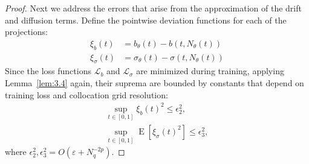 \documentclass[11pt, a4paper]{article}
\theoremstyle{theoremstyle}
\theoremstyle{definitionstyle}
\DeclareMathOperator{\EE}{\mathrm E}
\begin{document}
\begin{proof}
    Next we address the errors that arise from the approximation of the drift and diffusion terms. Define the pointwise deviation functions for each of the projections:
    \begin{subequations}
    \begin{align}
        \xi_b(t) &= b_\theta(t) - b(t, N_\theta(t)) \label{eq:52a} \\
        \xi_\sigma(t) &= \sigma_\theta(t) - \sigma(t, N_\theta(t)) \label{eq:52b}
    \end{align}
    \end{subequations}
    Since the loss functions \(\mathcal L_b\) and \(\mathcal L_\sigma\) are minimized during training, applying Lemma~\ref{lem:3.4} again, their suprema are bounded by constants that depend on training loss and collocation grid resolution:
    \begin{subequations}
    \begin{gather}
        \sup_{t \in [0, 1]} \xi_b(t)^2 \leq \epsilon_2^2, \\
        \sup_{t \in [0, 1]} \EE [\xi_\sigma(t)^2] \leq \epsilon_3^2,
    \end{gather}
    \end{subequations}
    where \(\epsilon_2^2, \epsilon_3^2 = O(\varepsilon + N_q^{-2p})\).


\end{proof}
\end{document}
